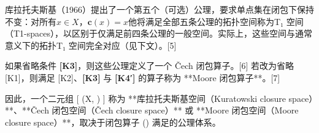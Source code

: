 库拉托夫斯基（1966）提出了一个第五个（可选）公理，要求单点集在闭包下保持不变：对所有$ x \in X $，$\mathbf{c}({x}) = {x}$他将满足全部五条公理的拓扑空间称为T₁ 空间（T1-spaces），以区别于仅满足前四条公理的一般空间。实际上，这些空间与通常意义下的拓扑T₁ 空间完全对应（见下文）。[5]

如果省略条件 \textbf{[K3]}，则这些公理定义了一个 Čech 闭包算子。[6]
若改为省略 [K1]，则满足 [K2]、\textbf{[K3]} 与 \textbf{[K4′]} 的算子称为 **Moore 闭包算子**。[7]

因此，一个二元组
[
(X, )
]
称为 **库拉托夫斯基空间（Kuratowski closure space）**、**Čech 闭包空间（Čech closure space）** 或 **Moore 闭包空间（Moore closure space）**，取决于闭包算子 () 满足的公理体系。
